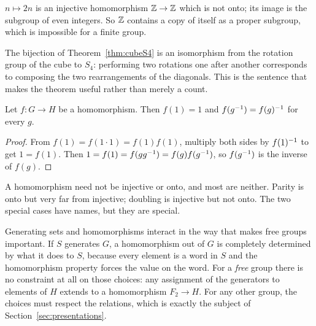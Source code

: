 
\begin{exa}
$n\mapsto 2n$ is an injective homomorphism $\mathbb{Z}\to\mathbb{Z}$ which is not onto; its image is the subgroup of
even integers. So $\mathbb{Z}$ contains a copy of itself as a proper subgroup, which is impossible for a
finite group.
\end{exa}

\begin{exa}
The bijection of Theorem~\ref{thm:cubeS4} is an isomorphism from the rotation group of the cube to
$S_4$: performing two rotations one after another corresponds to composing the two rearrangements of
the diagonals. This is the sentence that makes the theorem useful rather than merely a count.
\end{exa}




\begin{prop}\label{prop:homfacts}
Let $f:G\to H$ be a homomorphism. Then $f(1)=1$ and $f(g^{-1})=f(g)^{-1}$ for every $g$.
\end{prop}

\begin{proof}
From $f(1)=f(1\cdot1)=f(1)f(1)$, multiply both sides by $f(1)^{-1}$ to get $1=f(1)$. Then
$1=f(1)=f(gg^{-1})=f(g)f(g^{-1})$, so $f(g^{-1})$ is the inverse of $f(g)$.
\end{proof}

\begin{pitfall}
A homomorphism need not be injective or onto, and most are neither. Parity is onto but very far from
injective; doubling is injective but not onto. The two special cases have names, but they are
special.
\end{pitfall}

\begin{bigpic}
Generating sets and homomorphisms interact in the way that makes free groups important. If $S$
generates $G$, a homomorphism out of $G$ is completely determined by what it does to $S$, because
every element is a word in $S$ and the homomorphism property forces the value on the word. For a
\emph{free} group there is no constraint at all on those choices: any assignment of the generators
to elements of $H$ extends to a homomorphism $F_2\to H$. For any other group, the choices must
respect the relations, which is exactly the subject of Section~\ref{sec:presentations}.
\end{bigpic}

